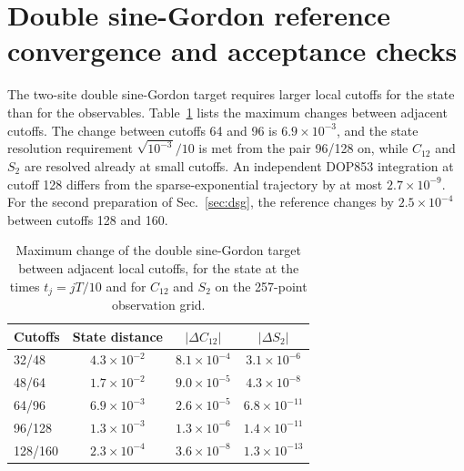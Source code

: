\documentclass[pra,twocolumn,superscriptaddress,nofootinbib,floatfix]{revtex4-2}
\theoremstyle{remark}
\newcommand{\revcolor}{\color{blue}}
\DeclareRobustCommand{\rev}[1]{{\revcolor #1}}
\begin{document}
\section{\rev{Double sine-Gordon reference convergence and acceptance checks}}
\label{app:dsg-convergence}

\rev{The two-site double sine-Gordon target requires larger local cutoffs for the state than for the observables.} \rev{Table~\ref{tab:dsg-convergence} lists the maximum changes between adjacent cutoffs.} \rev{The change between cutoffs 64 and 96 is \(6.9\times10^{-3}\), and the state resolution requirement \(\sqrt{10^{-3}}/10\) is met from the pair 96/128 on, while \(C_{12}\) and \(S_2\) are resolved already at small cutoffs.} \rev{An independent DOP853 integration at cutoff 128 differs from the sparse-exponential trajectory by at most \(2.7\times10^{-9}\).} \rev{For the second preparation of Sec.~\ref{sec:dsg}, the reference changes by \(2.5\times10^{-4}\) between cutoffs 128 and 160.}

\begin{table}[t]
\revcolor
\caption{Maximum change of the double sine-Gordon target between adjacent local cutoffs, for the state at the times \(t_j=jT/10\) and for \(C_{12}\) and \(S_2\) on the 257-point observation grid.}
\label{tab:dsg-convergence}
\begin{ruledtabular}
\begin{tabular}{lccc}
Cutoffs & State distance & \(|\Delta C_{12}|\) & \(|\Delta S_2|\) \\
\hline
32/48 & \(4.3\times10^{-2}\) & \(8.1\times10^{-4}\) & \(3.1\times10^{-6}\) \\
48/64 & \(1.7\times10^{-2}\) & \(9.0\times10^{-5}\) & \(4.3\times10^{-8}\) \\
64/96 & \(6.9\times10^{-3}\) & \(2.6\times10^{-5}\) & \(6.8\times10^{-11}\) \\
96/128 & \(1.3\times10^{-3}\) & \(1.3\times10^{-6}\) & \(1.4\times10^{-11}\) \\
128/160 & \(2.3\times10^{-4}\) & \(3.6\times10^{-8}\) & \(1.3\times10^{-13}\) \\
\end{tabular}
\end{ruledtabular}
\end{table}
\end{document}

